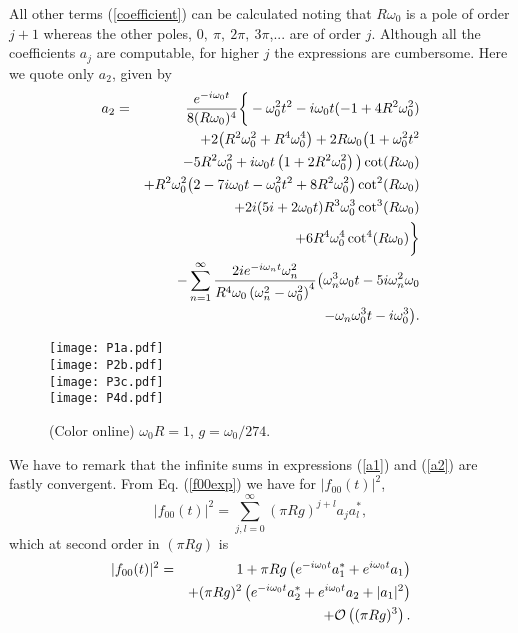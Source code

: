 \documentclass[10pt,english,twocolumn]{revtex4}
\begin{document}
%
All other terms (\ref{coefficient}) can be calculated noting that $R\omega_0$ is a pole of order $j+1$ whereas the other poles,
$0,~\pi, ~ 2\pi,~3\pi$,... are of order $j$. Although all the coefficients $a_j$ are computable,  for higher
$j$ the expressions are cumbersome. Here we quote only $a_2$,  given by
%
\begin{eqnarray}
a_2=&&\frac{e^{-i \omega_0 t}}{8 (R\omega_0)^4}\bigg\{-\omega_0^2 t^2-i \omega_0 t (-1+4 R^2\omega_0^2)\nonumber\\
&&+2 \big(R^2\omega_0^2+R^4\omega_0^4\big)
+2 R\omega_0 \big(1+\omega_0^2 t^2\nonumber \\
&&-5 R^2\omega_0^2
+i \omega_0 t \left(1+2 R^2\omega_0^2\right)\big) \cot(R \omega_0)\nonumber\\
&&+R^2\omega_0^2 \big(2
-7 i \omega_0 t-\omega_0^2 t^2+8 R^2\omega_0^2\big) \cot^2(R \omega_0)\nonumber\\
&& +2 i (5 i+2 \omega_0 t) R^3\omega_0^3 \cot^3(R \omega_0)\nonumber\\
&&+6 R^4\omega_0^4 \cot^4(R \omega_0)\bigg\}\cr
& &-\sum_{n=1}^{\infty}\frac{2 i e^{-i\omega_n t} \omega_n^2}
{R^4\omega_0 \left(\omega_n^2-\omega_0^2\right)^4}
\big(\omega_n^3 \omega_0 t-5 i \omega_n^2 \omega_0\nonumber\\
&&-\omega_n  \omega_0^3 t -i \omega_0^3\big).
\label{a2}
\end{eqnarray}
%
%
\begin{figure}[b!]
\texttt{[image: P1a.pdf]}\\
\texttt{[image: P2b.pdf]}\\
\texttt{[image: P3c.pdf]}\\
\texttt{[image: P4d.pdf]}
 \caption{(Color online)  $\omega_0R=1$, $g=\omega_0/274$.}
\label{fig1} 
\end{figure}
%
We have to remark that  the infinite sums in expressions (\ref{a1}) and (\ref{a2}) are  fastly convergent.  From Eq. (\ref{f00exp}) we have
for $|f_{00}(t)|^2$,
%
\begin{equation}
|f_{00}(t)|^2=\sum_{j,l=0}^\infty (\pi R g)^{j+l} a_j a_l^\ast,
\label{|foo|}
\end{equation}
%
which at second order  in $(\pi Rg)$ is 
%
\begin{eqnarray}
|f_{00}(t)|^2=&&1+\pi Rg\left(e^{-i\omega_0 t}a_1^\ast+e^{i\omega_0 t}a_1\right)\nonumber\\
&&
+
(\pi Rg)^2\left(e^{-i\omega_0 t}a_2^\ast+e^{i\omega_0 t}a_2+|a_1|^2\right)\nonumber\\
&&+{\cal O}\left((\pi R g)^3\right).
\label{foot3}
\end{eqnarray}
\end{document}
